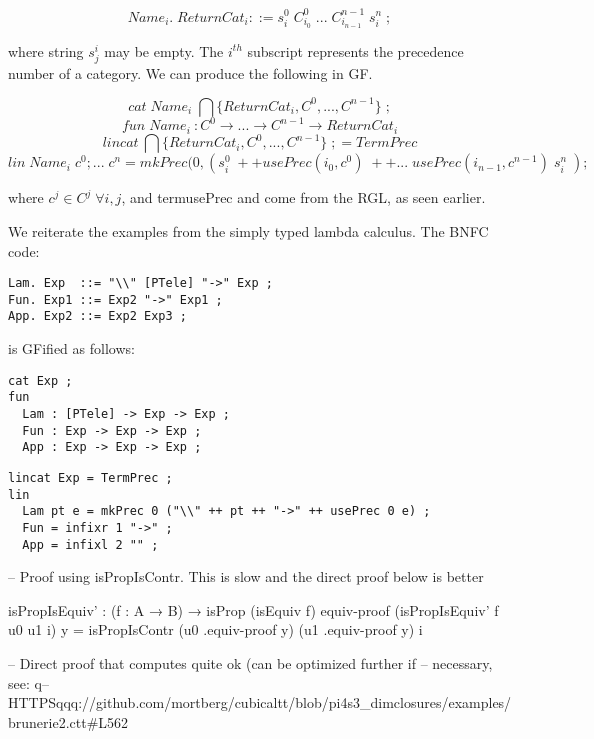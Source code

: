 $$Name_i.\; ReturnCat_i ::= s^0_{i}\;C^0_{i_0}\;...\;C^{n-1}_{i_{n-1}}\;s^n_{i}\;;$$

where string $s^i_j$ may be empty. The $i^{th}$ subscript represents the 
precedence number of a category. We can produce the following in GF.

$$cat\; Name_i\; \bigcap\{ReturnCat_i,C^0,..., C^{n-1}\}\;;$$
$$fun\; Name_i\:{:} C^0 \rightarrow ... \rightarrow C^{n-1} \rightarrow ReturnCat_i $$
$$lincat \: \bigcap\{ReturnCat_i,C^0,..., C^{n-1}\}\;; = TermPrec$$
$$lin \; Name_i\;c^0; ... \;c^n = mkPrec(0,(s^0_{i}\; ++
usePrec(i_0,c^0)\;++...\;usePrec(i_{n-1},c^{n-1})\;s^n_{i}\;) ;$$

where $c^j \in C^j \; \forall i,j$, and term{usePrec} and  come
from the RGL, as seen earlier.

We reiterate the examples from the simply typed lambda calculus. The BNFC code:

\begin{verbatim}
Lam. Exp  ::= "\\" [PTele] "->" Exp ;
Fun. Exp1 ::= Exp2 "->" Exp1 ;
App. Exp2 ::= Exp2 Exp3 ;
\end{verbatim}

is GFified as follows:

\begin{verbatim}
cat Exp ;
fun
  Lam : [PTele] -> Exp -> Exp ;
  Fun : Exp -> Exp -> Exp ;
  App : Exp -> Exp -> Exp ;
\end{verbatim}
\begin{verbatim}
lincat Exp = TermPrec ;
lin 
  Lam pt e = mkPrec 0 ("\\" ++ pt ++ "->" ++ usePrec 0 e) ;
  Fun = infixr 1 "->" ; 
  App = infixl 2 "" ;
\end{verbatim}


-- Proof using isPropIsContr. This is slow and the direct proof below is better

isPropIsEquiv' : (f : A → B) → isProp (isEquiv f)
equiv-proof (isPropIsEquiv' f u0 u1 i) y =
  isPropIsContr (u0 .equiv-proof y) (u1 .equiv-proof y) i

-- Direct proof that computes quite ok (can be optimized further if
-- necessary, see:
q-- HTTPSqqq://github.com/mortberg/cubicaltt/blob/pi4s3_dimclosures/examples/brunerie2.ctt#L562





